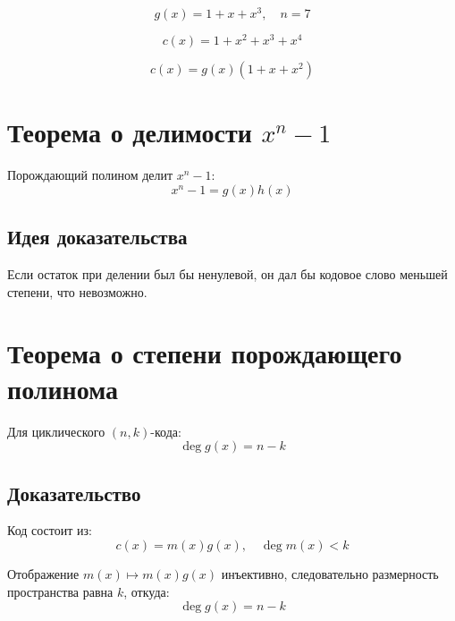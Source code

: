 \documentclass[a4paper,12pt]{article}
\begin{document}
\[
g(x) = 1 + x + x^3, \quad n = 7
\]

\[
c(x) = 1 + x^2 + x^3 + x^4
\]

\[
c(x) = g(x)(1 + x + x^2)
\]

\section{Теорема о делимости $x^n - 1$}

Порождающий полином делит $x^n - 1$:
\[
x^n - 1 = g(x)h(x)
\]

\subsection*{Идея доказательства}

Если остаток при делении был бы ненулевой, он дал бы кодовое слово
меньшей степени, что невозможно.

\section{Теорема о степени порождающего полинома}

Для циклического $(n,k)$-кода:
\[
\deg g(x) = n - k
\]

\subsection*{Доказательство}

Код состоит из:
\[
c(x) = m(x)g(x), \quad \deg m(x) < k
\]

Отображение $m(x) \mapsto m(x)g(x)$ инъективно, следовательно
размерность пространства равна $k$, откуда:
\[
\deg g(x) = n - k
\]
\end{document}
